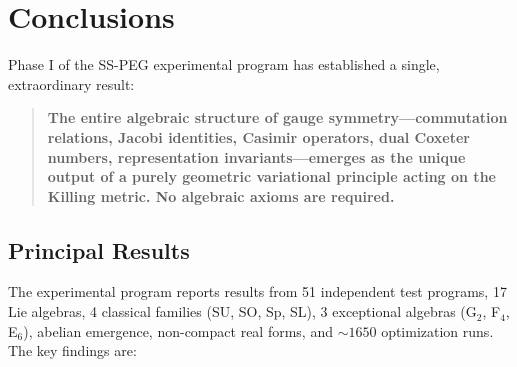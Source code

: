 \section{Conclusions}\label{sec:conclusion}

Phase I of the SS-PEG experimental program has established a single, extraordinary result:

\begin{quote}
\textbf{The entire algebraic structure of gauge symmetry---commutation relations, Jacobi identities, Casimir operators, dual Coxeter numbers, representation invariants---emerges as the unique output of a purely geometric variational principle acting on the Killing metric. No algebraic axioms are required.}
\end{quote}

\subsection{Principal Results}\label{sec:principal_results}

The experimental program reports results from 51 independent test programs, 17 Lie algebras, 4 classical families (SU, SO, Sp, SL), 3 exceptional algebras (G$_2$, F$_4$, E$_6$), abelian emergence, non-compact real forms, and $\sim 1650$ optimization runs. The key findings are:

